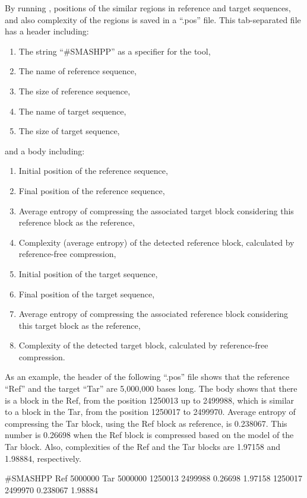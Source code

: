 By running \smashpp, positions of the similar regions in reference and target sequences, and also complexity of the regions is saved in a ``.pos'' file. This tab-separated file has a header including:
\begin{enumerate}
  \item The string ``\#SMASHPP'' as a specifier for the \smashpp tool,
  \item The name of reference sequence,
  \item The size of reference sequence,
  \item The name of target sequence,
  \item The size of target sequence,
\end{enumerate}
and a body including:
\begin{enumerate}
  \item Initial position of the reference sequence,
  \item Final position of the reference sequence,
  \item Average entropy of compressing the associated target block considering this reference block as the reference,
  \item Complexity (average entropy) of the detected reference block, calculated by reference-free compression,
  \item Initial position of the target sequence,
  \item Final position of the target sequence,
  \item Average entropy of compressing the associated reference block considering this target block as the reference,
  \item Complexity of the detected target block, calculated by reference-free compression.
\end{enumerate}
As an example, the header of the following ``.pos'' file shows that the reference ``Ref'' and the target ``Tar'' are 5,000,000 bases long. The body shows that there is a block in the Ref, from the position 1250013 up to 2499988, which is similar to a block in the Tar, from the position 1250017 to 2499970. Average entropy of compressing the Tar block, using the Ref block as reference, is 0.238067. This number is 0.26698 when the Ref block is compressed based on the model of the Tar block. Also, complexities of the Ref and the Tar blocks are 1.97158 and 1.98884, respectively.
\begin{code}[style=bash]
#SMASHPP Ref      5000000  Tar      5000000
1250013	 2499988  0.26698  1.97158  1250017  2499970  0.238067 1.98884
\end{code}


